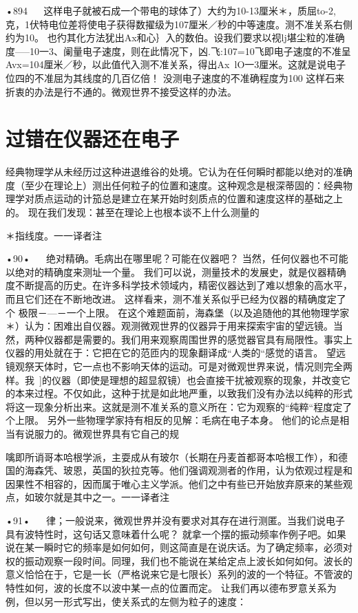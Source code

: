 •894
  
这样电子就被石成一个带电的球体了）大约为10-13厘米＊，质屈to-2,克，1伏特电位差将使电子获得数擢级为107厘米／秒的中等速度。测不准关系右侧约为10。
也彴其化方法犹出Ax和心｝入的数伯。设我们要求以视lj堪尘粒的准确度—--10一3、阑量电子速度，则在此情况下，凶.飞:107=10飞即电子速度的不准呈Avx=104厘米／秒，以此值代入测不准关系，得出Ax~lO一3厘米。这就是说电子位四的不准屈为其线度的几百亿倍！
没测电子速度的不准确程度为100%
这样石来折衷的办法是行不通的。微观世界不接受这样的办法。

\section{过错在仪器还在电子}

经典物理学从未经历过这种进退维谷的处境。它认为在任何瞬时都能以绝对的准确度（至少在理论上）测出任何粒子的位置和速度。这种观念是根深蒂固的：经典物理学对质点运动的计笳总是建立在某开始时刻质点的位置和速度这样的基础之上的。
现在我们发现：甚至在理论上也根本谈不上什么测量的

＊指线度。一一译者注

•90•
  
绝对精确。毛病出在哪里呢？可能在仪器吧？
当然，任何仪器也不可能以绝对的精确度来测址一个量。
我们可以说，测量技术的发展史，就是仪器精确度不断提高的历史。在许多科学技术领域内，精密仪器达到了难以想象的高水平，而且它们还在不断地改进。
这样看来，测不准关系似乎已经为仪器的精确度定了个
极限－—－一个上限。
在这个难题面前，海森堡（以及追随他的其他物理学家＊）认为：困难出自仪器。观测微观世界的仪器异于用来探索宇宙的望远镜。当然，两种仪器都是需要的。我们用来观察周围世界的感觉器官具有局限性。事实上仪器的用处就在于：它把在它的范匝内的现象翻译成“人类的“感觉的语言。
望远镜观祭天体时，它一点也不影响天体的运动。可是对微观世界来说，情况则完全两样。我~]的仪器（即使是理想的超显叙镜）也会直接干扰被观察的现象，并改变它的本来过桯。不仅如此，这种于扰是如此地严重，以致我们没有办法以纯粹的形式将这一现象分析出来。这就是测不准关系的意义所在：它为观察的“纯粹“程度定了个上限。
另外一些物理学家持有相反的见解：毛病在电子本身。
他们的论点是相当有说服力的。微观世界具有它自己的规

噙即所诮哥本哈根学派，主耍成从有玻尔（长期在丹麦首都哥本哈根工作），和德国的海森凭、玻恩，英国的狄拉克等。他们强调观测者的作用，认为侬观过程是和因果性不相容的，因而属于唯心主义学派。他们之中有些已开始放弃原来的某些观点，如玻尔就是其中之一。一一译者注

•91•
  
律；一般说来，微观世界并没有要求对其存在进行测匿。当我们说电子具有波特性时，这句话又意味着什么呢？
就拿一个摆的振动频率作例子吧。如果说在某一瞬时它的频率是如何如何，则这简直是在说庆话。为了确定频率，必须对权的振动观察一段时间。同理，我们也不能说在某给定点上波长如何如何。波长的意义恰恰在于，它是一长（严格说来它是七限长）系列的波的一个特征。不管波的特性如何，波的长度不以波中某一点的位置而定。
让我们再以德布罗意关系为例，但以另一形式写出，使关系式的左侧为粒子的速度：

